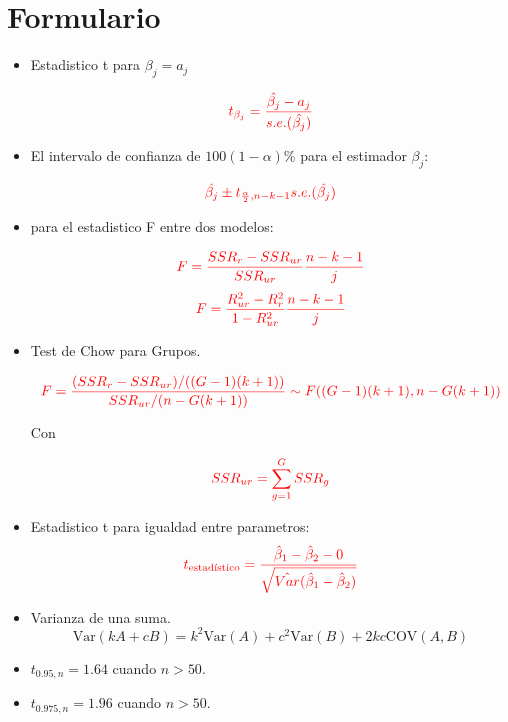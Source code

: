 \documentclass[10pt,a4paper]{article}
\begin{document}
\color{black}

\newpage

\section{Formulario}
\begin{itemize}


\item Estadistico t para $\beta_j = a_j$

$$\color{red}{t_{\beta_j}=\frac{\hat{\beta_j}-a_j}{s.e.(\hat{\beta_j})}}$$

\item El intervalo de confianza de $100(1-\alpha)\%$ para el estimador $\beta_j$:

$${\color{red}\hat{\beta_j} \pm t_{\frac{\alpha}{2},n-k-1}s.e.(\hat{\beta_j})}$$


\item para el estadistico F entre dos modelos:

$$\color{red}{F=\frac{SSR_r-SSR_{ur}}{SSR_{ur}}\frac{n-k-1}{j}}$$
$$\color{red}{F=\frac{R^2_{ur}-R^2_{r}}{1-R^2_{ur}}\frac{n-k-1}{j}}$$

\item Test de Chow para Grupos.

    \[\color{red}
    F = \frac{(SSR_r - SSR_{ur}) / ((G - 1)(k + 1))}{SSR_{ur} / (n - G(k + 1))} \sim F((G - 1)(k + 1), n - G(k + 1))
    \]

Con

$$\color{red}SSR_{ur} = \sum_{g=1}^G SSR_g$$

\item Estadistico t para igualdad entre parametros:
 \[\color{red}t_{\text{estadístico}} = \frac{\hat{\beta}_1 - \hat{\beta}_2 - 0}{\sqrt{\hat{Var}(\hat{\beta}_1 - \hat{\beta}_2)}}\]


\item  Varianza de una suma.
{\color{red}
$$\text{Var}(kA + cB) = k^2\text{Var}(A) + c^2\text{Var}(B) + 2kc\text{COV}(A, B)$$}

\item $t_{0.95,n} = 1.64$ cuando $n >50$.
\item $t_{0.975,n} = 1.96$ cuando $n >50$.


\end{itemize}
 
\end{document}
